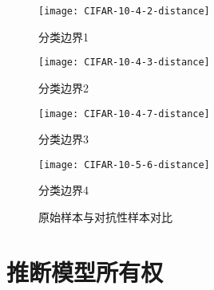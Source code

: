 \begin{figure}[htbp]%
	\centering
	\begin{minipage}[htbp]{0.49\linewidth}        %
		\hspace{2mm}
		\centering
		\texttt{[image: CIFAR-10-4-2-distance]}
		\centerline{分类边界1}
	\end{minipage}
	\begin{minipage}[htbp]{0.49\linewidth}        %
		\hspace{2mm}
		\centering
		\texttt{[image: CIFAR-10-4-3-distance]}
		\centerline{分类边界2}
	\end{minipage}
	\begin{minipage}[htbp]{0.49\linewidth}        %
		\hspace{2mm}
		\centering
		\texttt{[image: CIFAR-10-4-7-distance]}
		\centerline{分类边界3}
	\end{minipage}
	\begin{minipage}[htbp]{0.49\linewidth}        %
		\hspace{2mm}
		\centering
		\texttt{[image: CIFAR-10-5-6-distance]}
		\centerline{分类边界4}
	\end{minipage}
\setlength{\abovecaptionskip}{7mm} %
\caption{原始样本与对抗性样本对比}
\label{原始样本与对抗性样本对比1}
\end {figure}


\section{推断模型所有权}\label{5.4}

